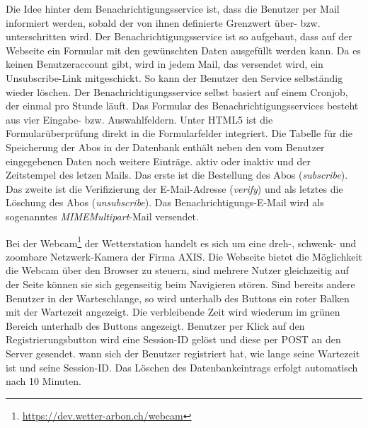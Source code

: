 \documentclass[11pt]{article}
\begin{document}
\begin{multicols}{2}
Die Idee hinter dem Benachrichtigungsservice ist, dass die Benutzer per Mail informiert werden, sobald der von ihnen definierte Grenzwert über- bzw. unterschritten wird. Der Benachrichtigungsservice ist so aufgebaut, dass auf der Webseite ein Formular mit den gewünschten Daten ausgefüllt werden kann. Da es keinen Benutzeraccount gibt, wird in jedem Mail, das versendet wird, ein Unsubscribe-Link mitgeschickt. So kann der Benutzer den Service selbständig wieder löschen. Der Benachrichtigungsservice selbst basiert auf einem Cronjob, der einmal pro Stunde läuft. Das Formular des Benachrichtigungsservices besteht aus vier Eingabe- bzw. Auswahlfeldern. Unter HTML5 ist die Formularüberprüfung direkt in die Formularfelder integriert. Die Tabelle für die Speicherung der Abos in der Datenbank enthält neben den vom Benutzer eingegebenen Daten noch weitere Einträge. aktiv oder inaktiv und der Zeitstempel des letzen Mails. Das erste ist die Bestellung des Abos (\textit{subscribe}). Das zweite ist die Verifizierung der E-Mail-Adresse (\textit{verify}) und als letztes die Löschung des Abos (\textit{unsubscribe}). Das Benachrichtigungs-E-Mail wird als sogenanntes \emph{MIMEMultipart}-Mail versendet.

Bei der Webcam\footnote{\url{https://dev.wetter-arbon.ch/webcam}} der Wetterstation handelt es sich um eine dreh-, schwenk- und zoombare Netzwerk-Kamera der Firma AXIS. Die Webseite bietet die Möglichkeit die Webcam über den Browser zu steuern, sind mehrere Nutzer gleichzeitig auf der Seite können sie sich gegenseitig beim Navigieren stören. Sind bereits andere Benutzer in der Warteschlange, so wird unterhalb des Buttons ein roter Balken mit der Wartezeit angezeigt. Die verbleibende Zeit wird wiederum im grünen Bereich unterhalb des Buttons angezeigt. Benutzer per Klick auf den Registrierungsbutton wird eine Session-ID gelöst und diese per POST an den Server gesendet. wann sich der Benutzer registriert hat, wie lange seine Wartezeit ist und seine Session-ID. Das Löschen des Datenbankeintrags erfolgt automatisch nach 10 Minuten.




\end{multicols}
 
\end{document}
